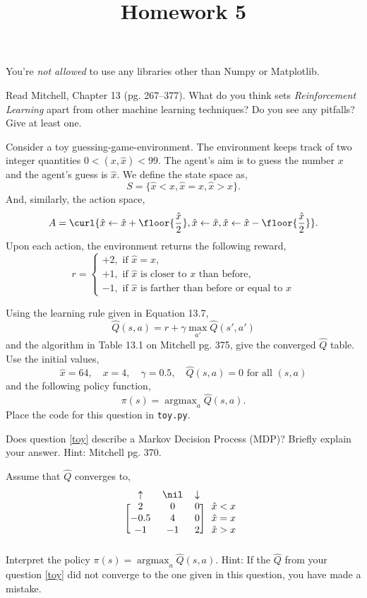 \documentclass{homework}
\title{Homework 5}
\DeclareMathOperator*{\argmax}{argmax}
\begin{document}
 \maketitle

You're \textit{not allowed} to use any libraries other than Numpy or
Matplotlib.

\question Read Mitchell, Chapter 13 (pg. 267--377). What do you think
sets \textit{Reinforcement Learning} apart from other machine learning
techniques? Do you see any pitfalls? Give at least one.


\question\label{toy} Consider a toy guessing-game-environment. The environment
keeps track of two integer quantities $0< (x, \hat{x}) < 99$. The
agent's aim is to guess the number $x$ and the agent's guess is
$\hat{x}$. We define the state space as,
\[
  S = \{\hat{x} < x, \hat{x} = x, \hat{x} > x\}.
\]
And, similarly, the action space,
\[
  A = \curl{
    \hat{x} \leftarrow \hat{x} + \floor{\frac{\hat{x}}{2}},
    \hat{x} \leftarrow \hat{x},
    \hat{x} \leftarrow \hat{x} - \floor{\frac{\hat{x}}{2}}}.
\]
Upon each action, the environment returns the following reward,
\[
  r =
  \begin{cases}
    +2, \text{ if } \hat{x} = x, \\
    +1, \text{ if } \hat{x} \text{ is closer to } x \text{ than before,}\\ 
    -1, \text{ if } \hat{x} \text{ is farther than before or equal to } x
  \end{cases}
\]

Using the learning rule given in Equation 13.7,
\[
  \hat{Q}(s, a) = r + \gamma \max_{a'}\hat{Q}(s', a')
\]
and the algorithm in Table 13.1 on Mitchell pg. 375, give the
converged $\hat{Q}$ table.  Use the initial values,
\[
  \hat{x} = 64, \quad x = 4, \quad \gamma = 0.5, \quad \hat{Q}(s, a) = 0 \text{ for all } (s, a)
\]
and the following policy function,
\[
  \pi(s) = \argmax_a\hat{Q}(s, a).
\]
Place the code for this question in \texttt{toy.py}.

\question Does question \ref{toy} describe a Markov Decision Process (MDP)?
Briefly explain your answer. Hint: Mitchell pg. 370.

\question Assume that $\hat{Q}$ converges to,
\[
  \begin{blockarray}{cccc}
    \uparrow & \nil & \downarrow & {}\\
    \begin{block}{[ccc]c}
      2    & 0  & 0 & \hat{x} < x \\
      -0.5 & 4  & 0 & \hat{x} = x \\
      -1   & -1 & 2 & \hat{x} > x \\
    \end{block}
  \end{blockarray}
\]
Interpret the policy $\pi(s) = \argmax_a\hat{Q}(s, a)$. Hint: If the
$\hat{Q}$ from your question \ref{toy} did not converge to the one
given in this question, you have made a mistake.
\end{document}
